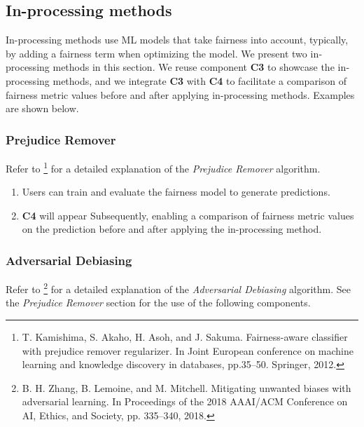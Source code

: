 \subsection{In-processing methods}

In-processing methods use ML models that take fairness into account, typically, by adding a fairness term when optimizing the model. 
We present two in‐processing methods in this section. 
We reuse component \textbf{C3} to showcase the in‐processing methods, and we integrate \textbf{C3} with \textbf{C4} to facilitate a comparison of fairness metric values before and after applying in‐processing methods. 
Examples are shown below.


\subsubsection{Prejudice Remover}

Refer to 
\footnote{T. Kamishima, S. Akaho, H. Asoh, and J. Sakuma. Fairness-aware classifier with prejudice remover regularizer. In Joint European conference on machine learning and knowledge discovery in databases, pp.35–50. Springer, 2012.} 
for a detailed explanation of the \emph{Prejudice Remover} algorithm.

\begin{enumerate}
    \item Users can train and evaluate the fairness model to generate predictions.
    \item \textbf{C4} will appear Subsequently, enabling a comparison of fairness metric values on the prediction before and after applying the in-processing method.
\end{enumerate}

\begin{VCSet}
    \begin{visualComponent}
    \end{visualComponent}
    
    \begin{visualComponent}
    \end{visualComponent}
\end{VCSet}

\subsubsection{Adversarial Debiasing}
Refer to 
\footnote{B. H. Zhang, B. Lemoine, and M. Mitchell. Mitigating unwanted biases with adversarial learning. In Proceedings of the 2018 AAAI/ACM Conference on AI, Ethics, and Society, pp. 335–340, 2018.} 
for a detailed explanation of the \emph{Adversarial Debiasing} algorithm.
See the \emph{Prejudice Remover} section for the use of the following components.


